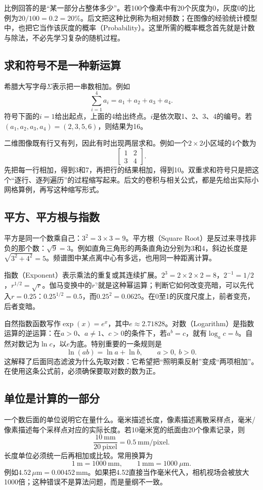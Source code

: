 比例回答的是“某一部分占整体多少”。若100个像素中有20个灰度为0，灰度0的比例为$20/100=0.2=20\%$。后文把这种比例称为相对频数；在图像的经验统计模型中，也把它当作该灰度的概率（Probability）。这里所需的概率概念首先就是计数与除法，不必先学习复杂的随机过程。

\subsection{求和符号不是一种新运算}
希腊大写字母$\Sigma$表示把一串数相加。例如
\[
\sum_{i=1}^{4}a_i=a_1+a_2+a_3+a_4.
\]
符号下面的$i=1$给出起点，上面的4给出终点。$i$是依次取1、2、3、4的编号。若$(a_1,a_2,a_3,a_4)=(2,3,5,6)$，则结果为16。

二维图像既有行又有列，因此有时出现两层求和。例如一个$2\times2$小区域的4个数为
\[
\begin{bmatrix}1&2\\3&4\end{bmatrix}.
\]
先把每一行相加，得到3和7，再把行的结果相加，得到10。双重求和符号只是把这个“逐行、逐列遍历”的过程缩写起来。后文的卷积与相关公式，都是先给出实际小网格算例，再写这种缩写形式。

\subsection{平方、平方根与指数}
平方是同一个数乘自己：$3^2=3\times3=9$。平方根（Square Root）是反过来寻找非负的那个数：$\sqrt9=3$。例如直角三角形的两条直角边分别为3和4，斜边长度是$\sqrt{3^2+4^2}=5$。频谱图中某点离中心有多远，也用同一种距离计算。

指数（Exponent）表示乘法的重复或其连续扩展。$2^3=2\times2\times2=8$，$2^{-1}=1/2$，$r^{1/2}=\sqrt r$。伽马变换中的$r^\gamma$就是这种幂运算；判断它如何改变亮暗，可以先代入$r=0.25$：$0.25^{1/2}=0.5$，而$0.25^2=0.0625$。在0至1的灰度尺度上，前者变亮，后者变暗。

自然指数函数写作$\exp(x)=e^x$，其中$e\approx2.71828$。对数（Logarithm）是指数运算的逆运算：在$a>0$、$a\ne1$、$c>0$的条件下，若$a^b=c$，就有$\log_a c=b$。自然对数记为$\ln c$，以$e$为底。特别重要的一条规则是
\[
\ln(ab)=\ln a+\ln b,\qquad a>0,\ b>0.
\]
这解释了后面同态滤波为什么先取对数：它希望把“照明乘反射”变成“两项相加”。在使用这条公式前，必须确保要取对数的数为正。

\subsection{单位是计算的一部分}
一个数后面的单位说明它在量什么。毫米描述长度，像素描述离散采样点，毫米/像素描述每个采样点对应的实际长度。若10毫米宽的纸面由20个像素记录，则
\[
\frac{10\ \mathrm{mm}}{20\ \mathrm{pixel}}=0.5\ \mathrm{mm/pixel}.
\]
长度单位必须统一后再相加或比较。常用换算为
\[
1\ \mathrm{m}=1000\ \mathrm{mm},\qquad
1\ \mathrm{mm}=1000\ \mu\mathrm{m}.
\]
例如$4.52\,\mu\mathrm{m}=0.00452\,\mathrm{mm}$。如果把4.52直接当作毫米代入，相机视场会被放大1000倍；这种错误不是算法问题，而是量纲不一致。

